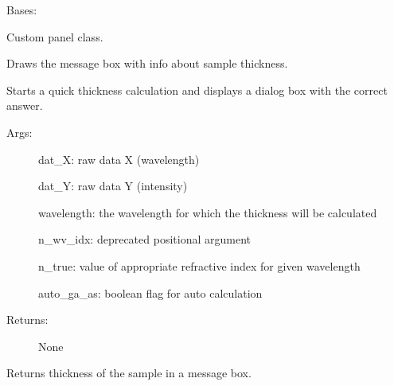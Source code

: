 \documentclass[letterpaper,10pt,english]{sphinxmanual}
\begin{document}

\begin{fulllineitems}
\label{\detokenize{GUI:GUI.MyPanel}}
Bases: 

Custom panel class.

\begin{fulllineitems}
\label{\detokenize{GUI:GUI.MyPanel.ShowMessage}}
Draws the message box with info about sample thickness.

Starts a quick thickness calculation and displays a dialog box with the correct answer.
\begin{description}
\item[{Args:}] \leavevmode
dat\_X: raw data X (wavelength)

dat\_Y: raw data Y (intensity)

wavelength: the wavelength for which the thickness will be calculated

n\_wv\_idx: deprecated positional argument

n\_true: value of appropriate refractive index for given wavelength

auto\_ga\_as: boolean flag for auto calculation

\item[{Returns:}] \leavevmode
None

\end{description}

\end{fulllineitems}


\begin{fulllineitems}
\label{\detokenize{GUI:GUI.MyPanel.calc_auto}}
Returns thickness of the sample in a message box.


\end{fulllineitems}
\end{fulllineitems}
\end{document}
